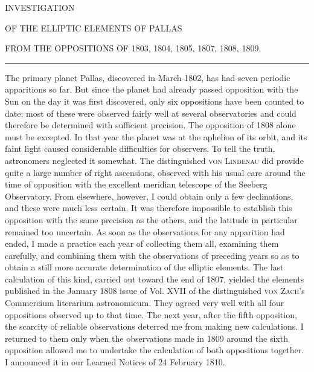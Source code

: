 \begin{center}
{\large INVESTIGATION}\par\medskip
{\Large OF THE ELLIPTIC ELEMENTS OF PALLAS}\par\medskip
FROM THE OPPOSITIONS OF 1803, 1804, 1805, 1807, 1808, 1809.
\par\medskip
\rule{.09\linewidth}{.3pt}
\end{center}
The primary planet Pallas, discovered in March 1802, has had seven periodic apparitions so far. But since the planet had already passed opposition with the Sun on the day it was first discovered, only six oppositions have been counted to date; most of these were observed fairly well at several observatories and could therefore be determined with sufficient precision. The opposition of 1808 alone must be excepted. In that year the planet was at the aphelion of its orbit, and its faint light caused considerable difficulties for observers. To tell the truth, astronomers neglected it somewhat. The distinguished \textsc{von Lindenau} did provide quite a large number of right ascensions, observed with his usual care around the time of opposition with the excellent meridian telescope of the Seeberg Observatory. From elsewhere, however, I could obtain only a few declinations, and these were much less certain. It was therefore impossible to establish this opposition with the same precision as the others, and the latitude in particular remained too uncertain.
As soon as the observations for any apparition had ended, I made a practice each year of collecting them all, examining them carefully, and combining them with the observations of preceding years so as to obtain a still \SourceGathering{1\textsuperscript{*}}more accurate determination of the elliptic elements. The last calculation of this kind, carried out toward the end of 1807, yielded the elements published in the January 1808 issue of Vol. XVII of the distinguished \textsc{von Zach}’s Commercium literarium astronomicum. They agreed very well with all four oppositions observed up to that time. The next year, after the fifth opposition, the scarcity of reliable observations deterred me from making new calculations. I returned to them only when the observations made in 1809 around the sixth opposition allowed me to undertake the calculation of both oppositions together. I announced it in our Learned Notices of 24 February 1810.


